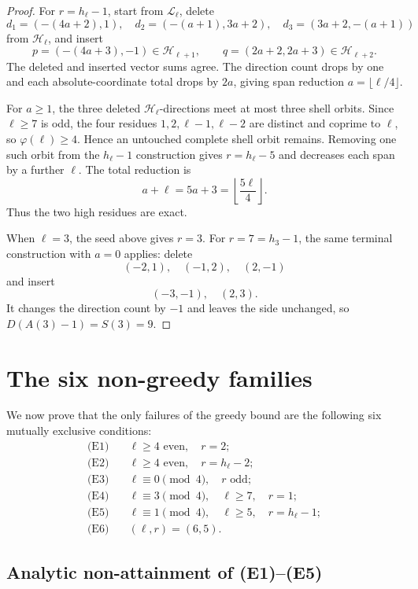\documentclass[11pt]{article}
\theoremstyle{definition}
\newcommand{\HH}{\mathcal H}
\newcommand{\LL}{\mathcal L}
\newcommand{\ph}{\varphi}
\begin{document}
\begin{proof}
For \(r=h_\ell-1\), start from \(\LL_\ell\), delete
\[
d_1=(-(4a+2),1),\quad
d_2=(-(a+1),3a+2),\quad
d_3=(3a+2,-(a+1))
\]
from \(\HH_\ell\), and insert
\[
p=(-(4a+3),-1)\in\HH_{\ell+1},\qquad
q=(2a+2,2a+3)\in\HH_{\ell+2}.
\]
The deleted and inserted vector sums agree.  The direction count drops by one and each absolute-coordinate total drops by \(2a\), giving span reduction \(a=\lfloor\ell/4\rfloor\).

For \(a\ge1\), the three deleted \(\HH_\ell\)-directions meet at most three shell orbits.  Since \(\ell\ge7\) is odd, the four residues
\(1,2,\ell-1,\ell-2\) are distinct and coprime to \(\ell\), so \(\ph(\ell)\ge4\).  Hence an untouched complete shell orbit remains.  Removing one such orbit from the \(h_\ell-1\) construction gives \(r=h_\ell-5\) and decreases each span by a further \(\ell\).  The total reduction is
\[
a+\ell=5a+3=\left\lfloor\frac{5\ell}{4}\right\rfloor.
\]
Thus the two high residues are exact.

When \(\ell=3\), the seed above gives \(r=3\).  For \(r=7=h_3-1\), the same terminal construction with \(a=0\) applies: delete
\[
(-2,1),\quad(-1,2),\quad(2,-1)
\]
and insert
\[
(-3,-1),\quad(2,3).
\]
It changes the direction count by \(-1\) and leaves the side unchanged, so \(D(A(3)-1)=S(3)=9\).
\end{proof}

\section{The six non-greedy families}\label{sec:exception}

We now prove that the only failures of the greedy bound are the following six mutually exclusive conditions:
\begin{align}
\text{(E1)}\quad&
\ell\ge4\text{ even},\quad r=2; \label{eq:E1}\\
\text{(E2)}\quad&
\ell\ge4\text{ even},\quad r=h_\ell-2; \label{eq:E2}\\
\text{(E3)}\quad&
\ell\equiv0\pmod4,\quad r\text{ odd}; \label{eq:E3}\\
\text{(E4)}\quad&
\ell\equiv3\pmod4,\quad \ell\ge7,\quad r=1; \label{eq:E4}\\
\text{(E5)}\quad&
\ell\equiv1\pmod4,\quad \ell\ge5,\quad r=h_\ell-1; \label{eq:E5}\\
\text{(E6)}\quad&
(\ell,r)=(6,5). \label{eq:E6}
\end{align}

\subsection{Analytic non-attainment of (E1)--(E5)}
\end{document}
